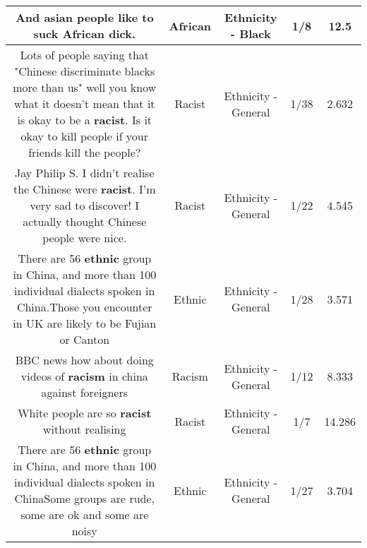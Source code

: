 \documentclass[11pt]{article}
\newlength\mylength
\begin{document}
\begin{center}
\begin{longtable}{|C{.65\mylength}|C{.30\mylength}|C{.12\mylength}|C{.12\mylength}|C{.12\mylength}|}
  \small And asian people like to suck \textbf{African} dick.\normalsize   & African & Ethnicity - Black & 1/8 & 12.5 \\  \hline
  \small Lots of people saying that "Chinese discriminate blacks more than us" well you know what it doesn't mean that it is okay to be a \textbf{racist}. Is it okay to kill people if your friends kill the people?\normalsize   & Racist & Ethnicity - General & 1/38 & 2.632 \\  \hline
  \small Jay Philip S. I didn't realise the Chinese were \textbf{racist}. I'm very sad to discover! I actually thought Chinese people were nice.\normalsize   & Racist & Ethnicity - General & 1/22 & 4.545 \\  \hline
  \small There are 56 \textbf{ethnic} group in China, and more than 100 individual dialects spoken in China.Those you encounter in UK are likely to be Fujian or Canton\normalsize   & Ethnic & Ethnicity - General & 1/28 & 3.571 \\  \hline
  \small BBC news how about doing videos of \textbf{racism} in china against foreigners\normalsize   & Racism & Ethnicity - General & 1/12 & 8.333 \\  \hline
  \small White people are so \textbf{racist} without realising\normalsize   & Racist & Ethnicity - General & 1/7 & 14.286 \\  \hline
  \small There are 56 \textbf{ethnic} group in China, and more than 100 individual dialects spoken in ChinaSome groups are rude, some are ok and some are noisy\normalsize   & Ethnic & Ethnicity - General & 1/27 & 3.704 \\  \hline

\end{longtable}
\end{center}
\end{document}
